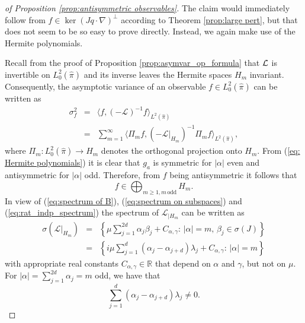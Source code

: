 \begin{proof}
	[of Proposition \ref{prop:antisymmetric observables}]
	The claim would
	immediately follow from $f\in\ker(Jq\cdot\nabla)^{\perp}$ according to Theorem \ref{prop:large pert}, but that does not seem to be so easy to prove directly. Instead, we again make
	use of the Hermite polynomials.
	
	Recall from the proof of Proposition \ref{prop:asymvar_op_formula} that $\operatorname{\mathcal{L}}$ is invertible on $L_{0}^{2}(\widehat{\pi})$ and its inverse leaves the Hermite spaces $H_m$ invariant. Consequently, the
	asymptotic variance of an observable $f\in L_{0}^{2}(\widehat{\pi})$ can be written as  
	\begin{subequations}
	\begin{eqnarray}
	\sigma_{f}^{2} & = & \langle f,(-\mathcal{L})^{-1}f\rangle_{L^{2}(\widehat{\pi})} \\
	& = & \sum_{m=1}^{\infty}\langle\Pi_{m}f,(-\mathcal{L}\vert_{H_{m}})^{-1}\Pi_{m}f\rangle_{L^2(\widehat{\pi})},\label{eq:asymvar decomposition} 
	\end{eqnarray}
	\end{subequations}
	where $\Pi_{m}:L_{0}^{2}(\widehat{\pi})\rightarrow H_{m}$ denotes the orthogonal
	projection onto $H_{m}$. From (\ref{eq: Hermite polynomials}) it
	is clear that $g_{a}$ is symmetric for $\vert\alpha\vert$ even and
	antisymmetric for $\vert\alpha\vert$ odd. Therefore, from $f$ being
	antisymmetric it follows that 
	\[
	f\in\bigoplus_{m\ge1,m\,\text{odd}}H_{m}.
	\]
	In view of (\ref{eq:spectrum of B}), (\ref{eq:spectrum on subspaces}) and (\ref{eq:rat_indp_spectrum})
	the spectrum of $\mathcal{L}_{\vert H_{m}}$ can be written as 
	\begin{subequations}
	\begin{eqnarray}
	\sigma(\mathcal{L}\vert_{H_{m}}) & = &\left\lbrace \mu\sum_{j=1}^{2d}\alpha_{j}\beta_{j}+C_{\alpha,\gamma}:\,\vert\alpha\vert=m,\,\beta_{j}\in\sigma(J)\right\rbrace  \nonumber \\
	& = & \left\lbrace i\mu\sum_{j=1}^{d}(\alpha_{j}-\alpha_{j+d})\lambda_{j}+C_{\alpha,\gamma}:\,\vert\alpha\vert=m\right\rbrace  \label{eq:spec_grow}
	\end{eqnarray}
	\end{subequations}
	with appropriate real constants $C_{\alpha,\gamma}\in\mathbb{R}$ that depend
	on $\alpha$ and $\gamma$, but not on $\mu$. For $\vert\alpha\vert=\sum_{j=1}^{2d} \alpha_j=m$ odd, we have that
	\begin{equation}
	\label{eq:nonzero}
	\sum_{j=1}^{d}(\alpha_{j}-\alpha_{j+d})\lambda_{j} \neq 0.

\end{equation}
\end{proof}

